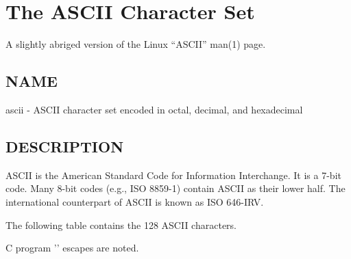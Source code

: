 \chapter{The ASCII Character Set}
\label{chapter:ascii}

A slightly abriged version of the Linux ``ASCII'' man(1) page.

\section{NAME}

ascii - ASCII character set encoded in octal, decimal, and hexadecimal

\section{DESCRIPTION}

       ASCII is the American Standard Code for Information Interchange.  It is
       a 7-bit code.  Many 8-bit codes (e.g., ISO  8859-1)  contain  ASCII  as
       their  lower  half.  The international counterpart of ASCII is known as
       ISO 646-IRV.

       The following table contains the 128 ASCII characters.

       C program '\verb@\X@' escapes are noted.

